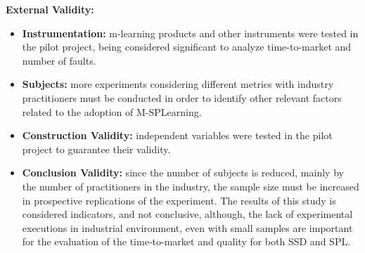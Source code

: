 \textbf{External Validity:} %

\begin{itemize}

\item \textbf{Instrumentation:} m-learning products and other instruments were tested in the pilot project, being considered significant to analyze time-to-market and number of faults.

\item \textbf{Subjects:} more experiments considering different metrics with industry practitioners must be conducted in order to identify other relevant factors related to the adoption of M-SPLearning.

\end{itemize}



\begin{itemize}

\item \textbf{Construction Validity:} independent variables were tested in the pilot project to guarantee their validity.


\item \textbf{Conclusion Validity:} since the number of subjects is reduced, mainly by the number of practitioners in the industry, the sample size must be increased in prospective replications of the experiment. The results of this study is considered indicators, and not conclusive, although, the lack of experimental executions in industrial environment, even with small samples are important for the evaluation of the time-to-market and quality for both SSD and SPL.



\end{itemize}



